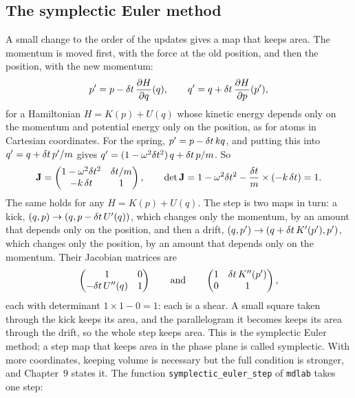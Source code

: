 \subsection*{The symplectic Euler method}

A small change to the order of the updates gives a map that keeps area.
The momentum is moved first, with the force at the old position, and then
the position, with the new momentum:
\begin{equation*}
   p' = p - \delta t\,\frac{\partial H}{\partial q}(q) , \qquad
   q' = q + \delta t\,\frac{\partial H}{\partial p}(p') ,
\end{equation*}
for a Hamiltonian $H = K(p) + U(q)$ whose kinetic energy depends only on
the momentum and potential energy only on the position, as for atoms in
Cartesian coordinates. For the spring, $p' = p - \delta t\,kq$, and putting
this into $q' = q + \delta t\,p'/m$ gives $q' = (1 - \omega^2\delta t^2)\,q + \delta t\,
p/m$. So
\begin{equation*}
   \bm{\mathrm{J}} = \begin{pmatrix} 1 - \omega^2\delta t^2 & \delta t/m\\ -k\,\delta t & 1
   \end{pmatrix} ,
   \qquad
   \det\bm{\mathrm{J}} = 1 - \omega^2\delta t^2 - \frac{\delta t}{m}\times(-k\,\delta t) = 1 .
\end{equation*}
The same holds for any $H = K(p) + U(q)$. The step is two maps in turn: a
kick, $(q, p) \to (q, p - \delta t\,U'(q))$, which changes only the momentum,
by an amount that depends only on the position, and then a drift, $(q, p')
\to (q + \delta t\,K'(p'), p')$, which changes only the position, by an amount
that depends only on the momentum. Their Jacobian matrices are
\begin{equation*}
   \begin{pmatrix} 1 & 0\\ -\delta t\,U''(q) & 1 \end{pmatrix}
   \qquad\text{and}\qquad
   \begin{pmatrix} 1 & \delta t\,K''(p')\\ 0 & 1 \end{pmatrix} ,
\end{equation*}
each with determinant $1\times1 - 0 = 1$: each is a shear. A small square
taken through the kick keeps its area, and the parallelogram it becomes
keeps its area through the drift, so the whole step keeps area. This is
the symplectic Euler method; a step map that keeps area in the phase
plane is called symplectic. With more coordinates, keeping volume is
necessary but the full condition is stronger, and Chapter~9 states
it\cite{LeimkuhlerMatthews2015}. The function \texttt{symplectic\_euler\_step}
of \texttt{mdlab} takes one step:

